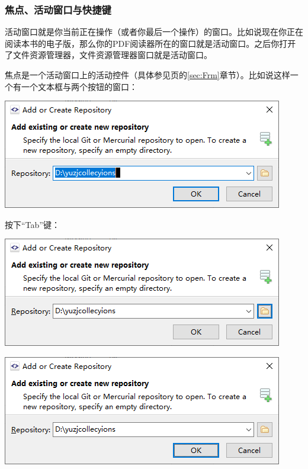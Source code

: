 \subsubsection{焦点、活动窗口与快捷键}
活动窗口就是你当前正在操作（或者你最后一个操作）的窗口。比如说现在你正在阅读本书的电子版，那么你的PDF阅读器所在的窗口就是活动窗口。之后你打开了文件资源管理器，文件资源管理器窗口就是活动窗口。\par
焦点是一个活动窗口上的活动控件（具体参见\pageref{sec:Frm}页的\ref{sec:Frm}章节）。比如说这样一个有一个文本框与两个按钮的窗口：\par
\begin{center}
	\includegraphics[scale=0.5]{pic/forcus1}
\end{center} \par
按下“Tab”键：\par
\begin{center}
	\includegraphics[scale=0.5]{pic/forcus2}
\end{center} \par
\begin{center}
	\includegraphics[scale=0.5]{pic/forcus3}
\end{center} \par

